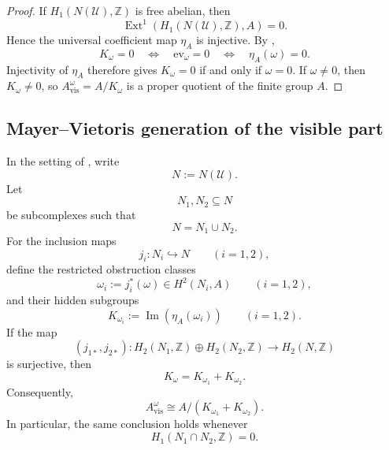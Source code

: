 \begin{proof}
If $H_1(N(\mathcal U),\mathbb Z)$ is free abelian, then
\[
\operatorname{Ext}^1(H_1(N(\mathcal U),\mathbb Z),A)=0.
\]
Hence the universal coefficient map $\eta_A$ is injective. By ,
\[
K_{\omega}=0
\quad\Longleftrightarrow\quad
\mathrm{ev}_{\omega}=0
\quad\Longleftrightarrow\quad
\eta_A(\omega)=0.
\]
Injectivity of $\eta_A$ therefore gives $K_{\omega}=0$ if and only if $\omega=0$. If $\omega\neq 0$, then $K_{\omega}\neq 0$, so $A_{\mathrm{vis}}^{\omega}=A/K_{\omega}$ is a proper quotient of the finite group $A$.
\end{proof}

\subsection{Mayer--Vietoris generation of the visible part}\label{subsec:mv-visible}

\begin{theorem}\label{thm:mv-hidden-subgroup}
In the setting of , write
\[
N:=N(\mathcal U).
\]
Let
\[
N_1,N_2\subseteq N
\]
be subcomplexes such that
\[
N=N_1\cup N_2.
\]
For the inclusion maps
\[
j_i:N_i\hookrightarrow N
\qquad
(i=1,2),
\]
define the restricted obstruction classes
\[
\omega_i:=j_i^*(\omega)\in H^2(N_i,A)
\qquad
(i=1,2),
\]
and their hidden subgroups
\[
K_{\omega_i}:=\operatorname{Im}(\eta_A(\omega_i))
\qquad
(i=1,2).
\]
If the map
\[
(j_{1*},j_{2*}):H_2(N_1,\mathbb Z)\oplus H_2(N_2,\mathbb Z)\longrightarrow H_2(N,\mathbb Z)
\]
is surjective, then
\[
K_{\omega}=K_{\omega_1}+K_{\omega_2}.
\]
Consequently,
\[
A_{\mathrm{vis}}^{\omega}\cong A/(K_{\omega_1}+K_{\omega_2}).
\]
In particular, the same conclusion holds whenever
\[
H_1(N_1\cap N_2,\mathbb Z)=0.
\]
\end{theorem}

